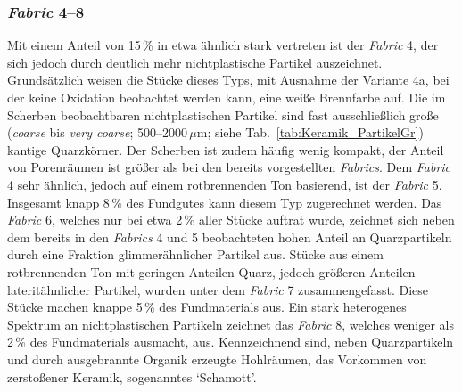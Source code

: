 \subsubsection*{\textit{Fabric} 4--8}

Mit einem Anteil von 15\,\% in etwa ähnlich stark vertreten ist der \textit{Fabric} 4, der sich jedoch durch deutlich mehr nichtplastische Partikel auszeichnet. Grundsätzlich weisen die Stücke dieses Typs, mit Ausnahme der Variante 4a, bei der keine Oxidation beobachtet werden kann, eine weiße Brennfarbe auf. Die im Scherben beobachtbaren nichtplastischen Partikel sind fast ausschließlich große (\textit{coarse} bis \textit{very coarse}; 500--2000\,$\mu$m; siehe Tab.~\ref{tab:Keramik_PartikelGr}) kantige Quarzkörner. Der Scherben ist zudem häufig wenig kompakt, der Anteil von Porenräumen ist größer als bei den bereits vorgestellten \textit{Fabrics}. Dem \textit{Fabric} 4 sehr ähnlich, jedoch auf einem rotbrennenden Ton basierend, ist der \textit{Fabric} 5. Insgesamt knapp 8\,\% des Fundgutes kann diesem Typ zugerechnet werden. Das \textit{Fabric} 6, welches nur bei etwa 2\,\% aller Stücke auftrat wurde, zeichnet sich neben dem bereits in den \textit{Fabrics} 4 und 5 beobachteten hohen Anteil an Quarzpartikeln durch eine Fraktion glimmerähnlicher Partikel aus. Stücke aus einem rotbrennenden Ton mit geringen Anteilen Quarz, jedoch größeren Anteilen lateritähnlicher Partikel, wurden unter dem \textit{Fabric} 7 zusammengefasst. Diese Stücke machen knappe 5\,\% des Fundmaterials aus. Ein stark heterogenes Spektrum an nichtplastischen Partikeln zeichnet das \textit{Fabric} 8, welches weniger als 2\,\% des Fundmaterials ausmacht, aus. Kennzeichnend sind, neben Quarzpartikeln und durch ausgebrannte Organik erzeugte Hohlräumen, das Vorkommen von zerstoßener Keramik, sogenanntes \enquote*{Schamott}.

